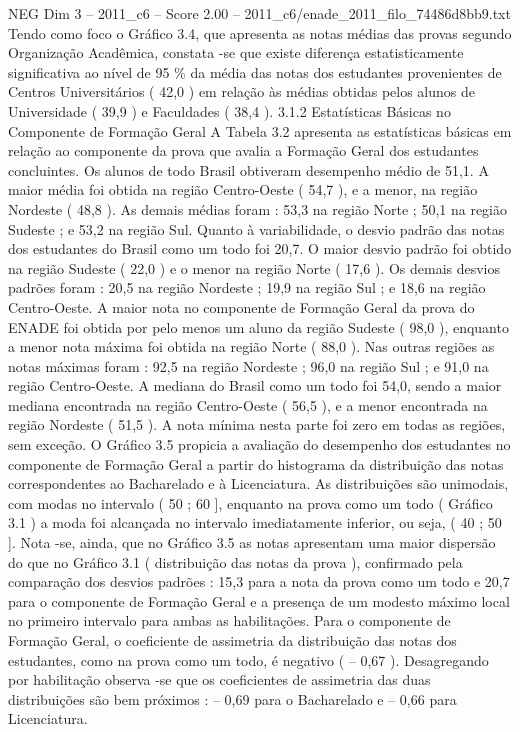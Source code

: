 \begin{textsample}{NEG Dim 3 – 2011\_c6 – Score 2.00 – 2011\_c6/enade\_2011\_filo\_74486d8bb9.txt}
Tendo como foco o Gráfico 3.4, que apresenta as notas médias das provas segundo Organização Acadêmica, constata -se que existe diferença estatisticamente significativa ao nível de 95 \% da média das notas dos estudantes provenientes de Centros Universitários ( 42,0 ) em relação às médias obtidas pelos alunos de Universidade ( 39,9 ) e Faculdades ( 38,4 ). 3.1.2 Estatísticas Básicas no Componente de Formação Geral A Tabela 3.2 apresenta as estatísticas básicas em relação ao componente da prova que avalia a Formação Geral dos estudantes concluintes.
Os alunos de todo Brasil obtiveram desempenho médio de 51,1.
A maior média foi obtida na região Centro-Oeste ( 54,7 ), e a menor, na região Nordeste ( 48,8 ).
As demais médias foram : 53,3 na região Norte ; 50,1 na região Sudeste ; e 53,2 na região Sul.
Quanto à variabilidade, o desvio padrão das notas dos estudantes do Brasil como um todo foi 20,7.
O maior desvio padrão foi obtido na região Sudeste ( 22,0 ) e o menor na região Norte ( 17,6 ).
Os demais desvios padrões foram : 20,5 na região Nordeste ; 19,9 na região Sul ; e 18,6 na região Centro-Oeste.
A maior nota no componente de Formação Geral da prova do ENADE foi obtida por pelo menos um aluno da região Sudeste ( 98,0 ), enquanto a menor nota máxima foi obtida na região Norte ( 88,0 ).
Nas outras regiões as notas máximas foram : 92,5 na região Nordeste ; 96,0 na região Sul ; e 91,0 na região Centro-Oeste.
A mediana do Brasil como um todo foi 54,0, sendo a maior mediana encontrada na região Centro-Oeste ( 56,5 ), e a menor encontrada na região Nordeste ( 51,5 ).
A nota mínima nesta parte foi zero em todas as regiões, sem exceção.
O Gráfico 3.5 propicia a avaliação do desempenho dos estudantes no componente de Formação Geral a partir do histograma da distribuição das notas correspondentes ao Bacharelado e à Licenciatura.
As distribuições são unimodais, com modas no intervalo ( 50 ; 60 ], enquanto na prova como um todo ( Gráfico 3.1 ) a moda foi alcançada no intervalo imediatamente inferior, ou seja, ( 40 ; 50 ].
Nota -se, ainda, que no Gráfico 3.5 as notas apresentam uma maior dispersão do que no Gráfico 3.1 ( distribuição das notas da prova ), confirmado pela comparação dos desvios padrões : 15,3 para a nota da prova como um todo e 20,7 para o componente de Formação Geral e a presença de um modesto máximo local no primeiro intervalo para ambas as habilitações.
Para o componente de Formação Geral, o coeficiente de assimetria da distribuição das notas dos estudantes, como na prova como um todo, é negativo ( – 0,67 ).
Desagregando por habilitação observa -se que os coeficientes de assimetria das duas distribuições são bem próximos : – 0,69 para o Bacharelado e – 0,66 para Licenciatura.

\end{textsample}
